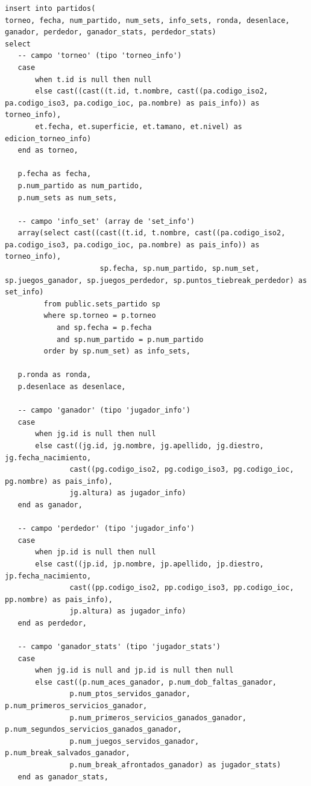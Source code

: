 \documentclass[11pt]{opticajnl}
\begin{document}
\begin{verbatim}
insert into partidos(
torneo, fecha, num_partido, num_sets, info_sets, ronda, desenlace, ganador, perdedor, ganador_stats, perdedor_stats)
select
   -- campo 'torneo' (tipo 'torneo_info')
   case
       when t.id is null then null
       else cast((cast((t.id, t.nombre, cast((pa.codigo_iso2, pa.codigo_iso3, pa.codigo_ioc, pa.nombre) as pais_info)) as torneo_info), 
       et.fecha, et.superficie, et.tamano, et.nivel) as edicion_torneo_info)
   end as torneo,
  
   p.fecha as fecha,
   p.num_partido as num_partido,
   p.num_sets as num_sets,
  
   -- campo 'info_set' (array de 'set_info')
   array(select cast((cast((t.id, t.nombre, cast((pa.codigo_iso2, pa.codigo_iso3, pa.codigo_ioc, pa.nombre) as pais_info)) as torneo_info),
                      sp.fecha, sp.num_partido, sp.num_set, sp.juegos_ganador, sp.juegos_perdedor, sp.puntos_tiebreak_perdedor) as set_info)
         from public.sets_partido sp
         where sp.torneo = p.torneo
         	and sp.fecha = p.fecha
         	and sp.num_partido = p.num_partido
         order by sp.num_set) as info_sets,
  
   p.ronda as ronda,
   p.desenlace as desenlace,
  
   -- campo 'ganador' (tipo 'jugador_info')
   case
       when jg.id is null then null
       else cast((jg.id, jg.nombre, jg.apellido, jg.diestro, jg.fecha_nacimiento,
       		   cast((pg.codigo_iso2, pg.codigo_iso3, pg.codigo_ioc, pg.nombre) as pais_info),
       		   jg.altura) as jugador_info)
   end as ganador,
  
   -- campo 'perdedor' (tipo 'jugador_info')
   case
       when jp.id is null then null
       else cast((jp.id, jp.nombre, jp.apellido, jp.diestro, jp.fecha_nacimiento,
       		   cast((pp.codigo_iso2, pp.codigo_iso3, pp.codigo_ioc, pp.nombre) as pais_info),
       		   jp.altura) as jugador_info)
   end as perdedor,
  
   -- campo 'ganador_stats' (tipo 'jugador_stats')
   case
       when jg.id is null and jp.id is null then null
       else cast((p.num_aces_ganador, p.num_dob_faltas_ganador,
           	   p.num_ptos_servidos_ganador, p.num_primeros_servicios_ganador,
           	   p.num_primeros_servicios_ganados_ganador, p.num_segundos_servicios_ganados_ganador,
           	   p.num_juegos_servidos_ganador, p.num_break_salvados_ganador,
           	   p.num_break_afrontados_ganador) as jugador_stats)
   end as ganador_stats,
  

\end{verbatim}
\end{document}
